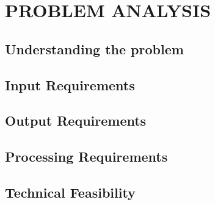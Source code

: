 \documentclass[main]{subfiles}
\begin{document}
\chapter{PROBLEM ANALYSIS}
\lipsum[2]
\section{Understanding the problem}
	\lipsum[1]
\section{Input Requirements}
	\lipsum[1]
\section{Output Requirements}
	\lipsum[1]
\section{Processing Requirements}
	\lipsum[1]
\section{Technical Feasibility}
	\lipsum[3]
\end{document}
